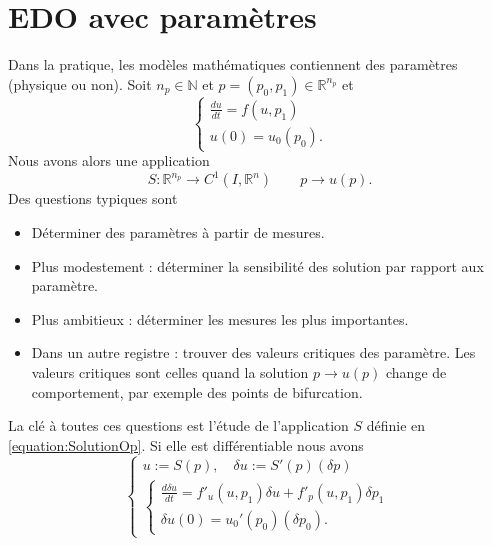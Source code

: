\documentclass[11pt,a4paper, french]{article}
\newcommand{\N}{\mathbb N}
\newcommand{\R}{\mathbb R}
\begin{document}
\section{EDO avec paramètres}\label{sec:}
%
Dans la pratique, les modèles mathématiques contiennent des paramètres (physique ou non). Soit $n_p\in\N$ et $p=(p_0,p_1)\in \R^{n_p}$ et
%
\begin{equation}\label{equation:EDOParam}
\left\{
\begin{aligned}
\frac{du}{dt} = f(u,p_1)\\
u(0) = u_0(p_0).
\end{aligned}
\right.
\end{equation}
%
Nous avons alors une application
%
\begin{equation}\label{equation:SolutionOp}
S:\R^{n_p}\to C^1(I,\R^n)\qquad p \to u(p).
\end{equation}
%
%
Des questions typiques sont
\begin{itemize}
\item Déterminer des paramètres à partir de mesures.
\item Plus modestement : déterminer la sensibilité des solution par rapport aux paramètre.
\item Plus ambitieux : déterminer les mesures les plus importantes.
\item Dans un autre registre : trouver des valeurs critiques des paramètre. Les valeurs critiques sont celles quand la solution $p\to u(p)$ change de comportement, par exemple des points de bifurcation.
\end{itemize}
%
La clé à toutes ces questions est l'étude de l'application $S$ définie en \eqref{equation:SolutionOp}. 
Si elle est différentiable nous avons
%
\begin{equation}\label{equation:}
\left\{
\begin{aligned}
u:= S(p), \quad \delta u := S'(p)(\delta p)\\
%
\left\{
\begin{aligned}
\frac{d\delta u}{dt} = f'_u(u,p_1)\delta u + f'_p(u,p_1)\delta p_1\\
\delta u(0) = u_0'(p_0)(\delta p_0).
\end{aligned}
\right.
%
\end{aligned}
\right.
\end{equation}
%
%
%



\end{document}

